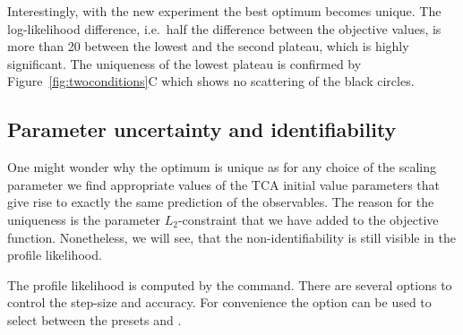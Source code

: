 \documentclass[article]{jss}
\begin{document}
Interestingly, with the new experiment the best optimum becomes unique. The log-likelihood difference, i.e.~half the difference between the objective values, is more than 20 between the lowest and the second plateau, which is highly significant. The uniqueness of the lowest plateau is confirmed by Figure~\ref{fig:twoconditions}C which shows no scattering of the black circles.

\subsection{Parameter uncertainty and identifiability}
\label{chap_uncertainty}

One might wonder why the optimum is unique as for any choice of the scaling parameter  we find appropriate values of the TCA initial value parameters that give rise to exactly the same prediction of the observables. The reason for the uniqueness is the parameter $L_2$-constraint that we have added to the objective function. Nonetheless, we will see, that the non-identifiability is still visible in the profile likelihood.

The profile likelihood is computed by the  command. There are several options to control the step-size and accuracy. For convenience the  option can be used to select between the presets  and .
\end{document}
